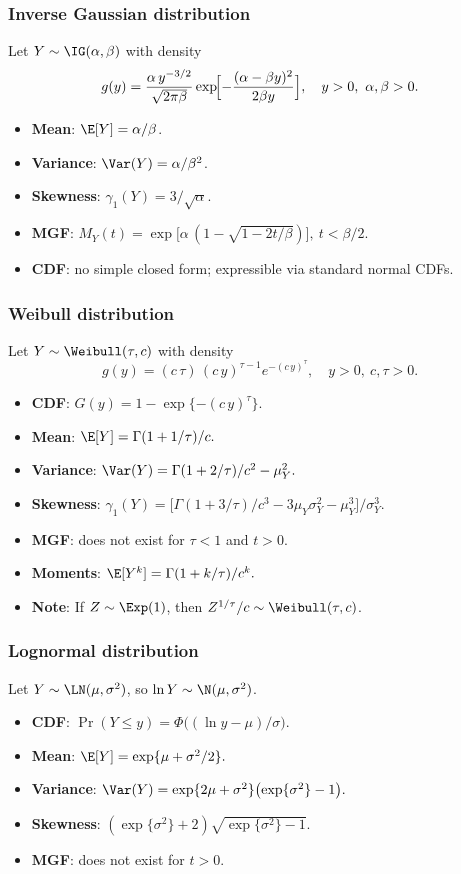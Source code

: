 \documentclass[11pt]{article}
\newcommand{\noi}{\noindent}
\begin{document}
\subsubsection{Inverse Gaussian distribution}
\noi Let \(Y\sim\IG(\alpha,\beta)\) with density
\[
g(y)
=\frac{\alpha\,y^{-3/2}}{\sqrt{2\pi\beta}}
\exp\!\Bigl[-\frac{(\alpha-\beta y)^2}{2\beta y}\Bigr],
\quad y>0,\ \alpha,\beta>0.
\]
\begin{itemize}
  \item \textbf{Mean}: \(\E[Y]=\alpha/\beta\).
  \item \textbf{Variance}: \(\Var(Y)=\alpha/\beta^2\).
  \item \textbf{Skewness}: \(\gamma_1(Y)=3/\sqrt{\alpha}.\)
  \item \textbf{MGF}: \(M_Y(t)=\exp\!\bigl[\alpha\,(1-\sqrt{1-2t/\beta})\bigr],\ t<\beta/2.\)
  \item \textbf{CDF}: no simple closed form; expressible via standard normal CDFs.
\end{itemize}

\subsubsection{Weibull distribution}
\noi Let \(Y\sim\Weibull(\tau,c)\) with density
\[
g(y)=(c\,\tau)\,(c\,y)^{\tau-1}e^{-(c\,y)^\tau},
\quad y>0,\ c,\tau>0.
\]
\begin{itemize}
  \item \textbf{CDF}: \(G(y)=1-\exp\{-(c\,y)^\tau\}.\)
  \item \textbf{Mean}: \(\E[Y]=\Gamma(1+1/\tau)/c.\)
  \item \textbf{Variance}: \(\Var(Y)=\Gamma(1+2/\tau)/c^2 -\mu_Y^2.\)
  \item \textbf{Skewness}: 
    \(\gamma_1(Y)
    =\bigl[\Gamma(1+3/\tau)/c^3 -3\mu_Y\sigma_Y^2-\mu_Y^3\bigr]/\sigma_Y^3.\)
  \item \textbf{MGF}: does not exist for \(\tau<1\) and \(t>0\).
  \item \textbf{Moments}: \(\E[Y^k]=\Gamma(1+k/\tau)/c^k.\)
  \item \textbf{Note}: If \(Z\sim\Exp(1)\), then \(Z^{1/\tau}/c\sim\Weibull(\tau,c)\).
\end{itemize}

\subsubsection{Lognormal distribution}
\noi Let \(Y\sim\LN(\mu,\sigma^2)\), so \(\ln Y\sim\N(\mu,\sigma^2)\).
\begin{itemize}
  \item \textbf{CDF}: \(\Pr(Y\le y)=\Phi\bigl((\ln y-\mu)/\sigma\bigr).\)
  \item \textbf{Mean}: \(\E[Y]=\exp\{\mu+\sigma^2/2\}.\)
  \item \textbf{Variance}: \(\Var(Y)=\exp\{2\mu+\sigma^2\}\bigl(\exp\{\sigma^2\}-1\bigr).\)
  \item \textbf{Skewness}: \((\exp\{\sigma^2\}+2)\sqrt{\exp\{\sigma^2\}-1}.\)
  \item \textbf{MGF}: does not exist for \(t>0\).
\end{itemize}
\end{document}
